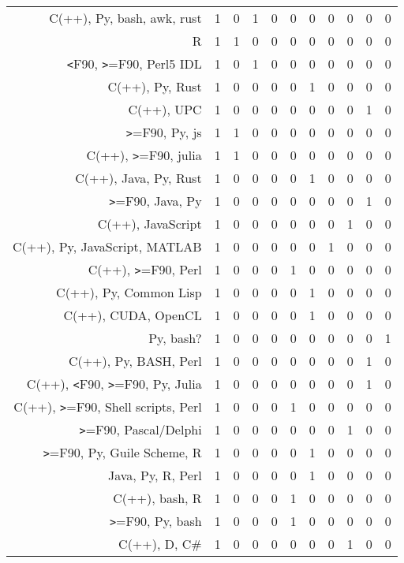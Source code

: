 {\begin{landscape}
\begin{longtable}[htb]{r|c|c|c|c|c|c|c|c|c|c}
{C(++), Py, bash, awk, rust} & 1 & 0 & 1 & 0 & 0 & 0 & 0 & 0 & 0 & 0 \\%
{R} & 1 & 1 & 0 & 0 & 0 & 0 & 0 & 0 & 0 & 0 \\%
{\verb!<!F90, \verb!>!=F90, Perl5 IDL} & 1 & 0 & 1 & 0 & 0 & 0 & 0 & 0 & 0 & 0 \\%
{C(++), Py, Rust} & 1 & 0 & 0 & 0 & 0 & 1 & 0 & 0 & 0 & 0 \\%
{C(++), UPC} & 1 & 0 & 0 & 0 & 0 & 0 & 0 & 0 & 1 & 0 \\%
{\verb!>!=F90, Py, js} & 1 & 1 & 0 & 0 & 0 & 0 & 0 & 0 & 0 & 0 \\%
{C(++), \verb!>!=F90, julia} & 1 & 1 & 0 & 0 & 0 & 0 & 0 & 0 & 0 & 0 \\%
{C(++), Java, Py, Rust} & 1 & 0 & 0 & 0 & 0 & 1 & 0 & 0 & 0 & 0 \\%
{\verb!>!=F90, Java, Py} & 1 & 0 & 0 & 0 & 0 & 0 & 0 & 0 & 1 & 0 \\%
{C(++), JavaScript} & 1 & 0 & 0 & 0 & 0 & 0 & 0 & 1 & 0 & 0 \\%
{C(++), Py, JavaScript, MATLAB} & 1 & 0 & 0 & 0 & 0 & 0 & 1 & 0 & 0 & 0 \\%
{C(++), \verb!>!=F90, Perl} & 1 & 0 & 0 & 0 & 1 & 0 & 0 & 0 & 0 & 0 \\%
{C(++), Py, Common Lisp} & 1 & 0 & 0 & 0 & 0 & 1 & 0 & 0 & 0 & 0 \\%
{C(++), CUDA, OpenCL} & 1 & 0 & 0 & 0 & 0 & 1 & 0 & 0 & 0 & 0 \\%
{Py, bash?} & 1 & 0 & 0 & 0 & 0 & 0 & 0 & 0 & 0 & 1 \\%
{C(++), Py, BASH, Perl} & 1 & 0 & 0 & 0 & 0 & 0 & 0 & 0 & 1 & 0 \\%
{C(++), \verb!<!F90, \verb!>!=F90, Py, Julia} & 1 & 0 & 0 & 0 & 0 & 0 & 0 & 0 & 1 & 0 \\%
{C(++), \verb!>!=F90, Shell scripts, Perl} & 1 & 0 & 0 & 0 & 1 & 0 & 0 & 0 & 0 & 0 \\%
{\verb!>!=F90, Pascal/Delphi} & 1 & 0 & 0 & 0 & 0 & 0 & 0 & 1 & 0 & 0 \\%
{\verb!>!=F90, Py, Guile Scheme, R} & 1 & 0 & 0 & 0 & 0 & 1 & 0 & 0 & 0 & 0 \\%
{Java, Py, R, Perl} & 1 & 0 & 0 & 0 & 0 & 1 & 0 & 0 & 0 & 0 \\%
{C(++), bash, R} & 1 & 0 & 0 & 0 & 1 & 0 & 0 & 0 & 0 & 0 \\%
{\verb!>!=F90, Py, bash} & 1 & 0 & 0 & 0 & 1 & 0 & 0 & 0 & 0 & 0 \\%
{C(++), D, C\#} & 1 & 0 & 0 & 0 & 0 & 0 & 0 & 1 & 0 & 0 \\%

\end{longtable}
\end{landscape}}
